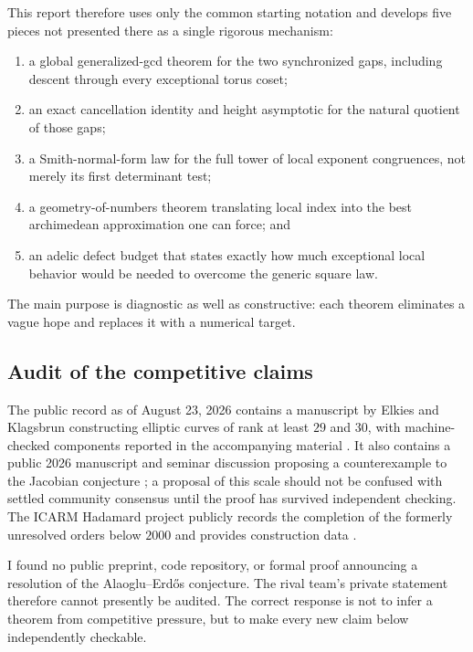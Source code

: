 \documentclass[11pt,oneside]{article}
\theoremstyle{definition}
\begin{document}
This report therefore uses only the common starting notation and develops
five pieces not presented there as a single rigorous mechanism:
\begin{enumerate}
  \item a global generalized-gcd theorem for the two synchronized gaps,
        including descent through every exceptional torus coset;
  \item an exact cancellation identity and height asymptotic for the
        natural quotient of those gaps;
  \item a Smith-normal-form law for the full tower of local exponent
        congruences, not merely its first determinant test;
  \item a geometry-of-numbers theorem translating local index into the
        best archimedean approximation one can force; and
  \item an adelic defect budget that states exactly how much exceptional
        local behavior would be needed to overcome the generic square law.
\end{enumerate}

The main purpose is diagnostic as well as constructive: each theorem
eliminates a vague hope and replaces it with a numerical target.

\subsection{Audit of the competitive claims}

The public record as of August 23, 2026 contains a manuscript by Elkies
and Klagsbrun constructing elliptic curves of rank at least $29$ and $30$,
with machine-checked components reported in the accompanying material
\cite{ElkiesKlagsbrun2026}.  It also contains a public 2026 manuscript and
seminar discussion proposing a counterexample to the Jacobian conjecture
\cite{Jacobian2026,Struppa2026}; a proposal of this scale should not be
confused with settled community consensus until the proof has survived
independent checking.  The ICARM Hadamard project publicly records the
completion of the formerly unresolved orders below $2000$ and provides
construction data \cite{ICARMHadamard2026}.

I found no public preprint, code repository, or formal proof announcing a
resolution of the Alaoglu--Erd\H{o}s conjecture.  The rival team's private
statement therefore cannot presently be audited.  The correct response is
not to infer a theorem from competitive pressure, but to make every new
claim below independently checkable.
\end{document}
